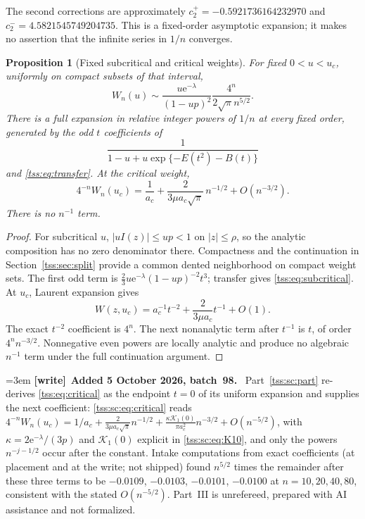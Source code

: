 \documentclass[11pt]{article}
\newtheorem{proposition}[theorem]{Proposition}
\theoremstyle{remark}\newtheorem{remark}[theorem]{Remark}
\theoremstyle{definition}\newtheorem{definition}[theorem]{Definition}
\newcommand{\e}{\mathrm e}
\newenvironment{writenote}[1][]{\par\smallskip\begingroup\small\emergencystretch=3em
 \noindent\textbf{[write]}\if\relax\detokenize{#1}\relax\else~\textbf{#1.}\fi\ }%
 {\par\endgroup\smallskip}
\begin{document}
The second corrections are approximately
$c_2^+=-0.5921736164232970$ and $c_2^-=4.5821545749204735$.
This is a fixed-order asymptotic expansion; it makes no assertion that the infinite series in $1/n$ converges.

\begin{proposition}[Fixed subcritical and critical weights]\label{tss:prop:fixedu}
For fixed $0<u<u_c$, uniformly on compact subsets of that interval,
\begin{equation}\label{tss:eq:subcritical}
W_n(u)\sim \frac{u\e^{-\lambda}}{(1-up)^2}
 \frac{4^n}{2\sqrt\pi n^{5/2}}.
\end{equation}
There is a full expansion in relative integer powers of $1/n$ at every fixed order, generated by the odd $t$ coefficients of
\[
\frac1{1-u+u\exp\{-E(t^2)-B(t)\}}
\]
and \eqref{tss:eq:transfer}. At the critical weight,
\begin{equation}\label{tss:eq:critical}
4^{-n}W_n(u_c)=\frac1{a_c}
 +\frac{2}{3\mu a_c\sqrt\pi}\,n^{-1/2}+O(n^{-3/2}).
\end{equation}
There is no $n^{-1}$ term.
\end{proposition}
\begin{proof}
For subcritical $u$, $|uI(z)|\leq up<1$ on $|z|\leq\rho$, so the analytic composition has no zero denominator there. Compactness and the continuation in Section~\ref{tss:sec:split} provide a common dented neighborhood on compact weight sets. The first odd term is
$\frac23u\e^{-\lambda}(1-up)^{-2}t^3$; transfer gives \eqref{tss:eq:subcritical}. At $u_c$, Laurent expansion gives
\[
W(z,u_c)=a_c^{-1}t^{-2}+\frac{2}{3\mu a_c}t^{-1}+O(1).
\]
The exact $t^{-2}$ coefficient is $4^n$. The next nonanalytic term after $t^{-1}$ is $t$, of order $4^nn^{-3/2}$. Nonnegative even powers are locally analytic and produce no algebraic $n^{-1}$ term under the full continuation argument.
\end{proof}

\begin{writenote}[Added 5 October 2026, batch~98]
Part~\ref{tss:sc:part} re-derives \eqref{tss:eq:critical} as the endpoint
$t=0$ of its uniform expansion and supplies the next coefficient:
\eqref{tss:sc:eq:critical} reads
$4^{-n}W_n(u_c)=1/a_c+\frac{2}{3\mu a_c\sqrt\pi}n^{-1/2}
+\frac{\kappa\mathcal K_1(0)}{\pi a_c^2}n^{-3/2}+O(n^{-5/2})$, with
$\kappa=2\e^{-\lambda}/(3p)$ and $\mathcal K_1(0)$ explicit in
\eqref{tss:sc:eq:K10}, and only the powers $n^{-j-1/2}$ occur after the
constant. Intake computations from exact coefficients (at placement and
at the write; not shipped) found $n^{5/2}$ times the remainder after these
three terms to be $-0.0109$, $-0.0103$, $-0.0101$, $-0.0100$ at
$n=10,20,40,80$, consistent with the stated $O(n^{-5/2})$. Part~III is unrefereed, prepared with AI assistance and not
formalized.
\end{writenote}
\end{document}
